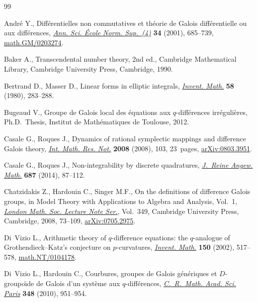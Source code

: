 \documentclass[pdftex]{sigma}
\numberwithin{equation}{section}
\begin{document}
\begin{thebibliography}{99}
\footnotesize \itemsep=0pt

Andr{\'e} Y., Dif\/f\'erentielles non commutatives et th\'eorie de {G}alois dif\/f\'erentielle ou aux dif\/f\'erences,
\href{http://dx.doi.org/10.1016/S0012-9593(01)01074-6}{\textit{Ann. Sci. \'Ecole Norm. Sup.~(4)}} \textbf{34} (2001), 685--739, \href{http://arxiv.org/abs/math.GM/0203274}{math.GM/0203274}.

Baker A., Transcendental number theory, 2nd ed., Cambridge Mathematical Library, Cambridge University Press, Cambridge,
1990.

Bertrand D., Masser D., Linear forms in elliptic integrals, \href{http://dx.doi.org/10.1007/BF01390255}{\textit{Invent. Math.}} \textbf{58} (1980), 283--288.

Bugeaud V., Groupe de {G}alois local des \'equations aux {$q$}-dif\/f\'erences irr\'eguli\`eres, Ph.D.~Thesis, Institut de
Math\'ematiques de Toulouse, 2012.

Casale G., Roques J., Dynamics of rational symplectic mappings and dif\/ference {G}alois theory,
\href{http://dx.doi.org/10.1093/imrn/rnn103}{\textit{Int. Math. Res. Not.}} \textbf{2008} (2008), 103, 23~pages, \href{http://arxiv.org/abs/0803.3951}{arXiv:0803.3951}.

Casale G., Roques J., Non-integrability by discrete quadratures,
\href{http://dx.doi.org/10.1515/crelle-2012-0054}{\textit{J.~Reine Angew. Math.}} \textbf{687} (2014), 87--112.

Chatzidakis Z., Hardouin C., Singer M.F., On the def\/initions of dif\/ference {G}alois groups, in Model Theory with
Applications to Algebra and Analysis, {V}ol.~1, \href{http://dx.doi.org/10.1017/CBO9780511735226.006}{\textit{London Math. Soc. Lecture Note Ser.}}, Vol.~349, Cambridge University Press, Cambridge, 2008, 73--109,
\href{http://arxiv.org/abs/0705.2975}{arXiv:0705.2975}.

Di~Vizio L., Arithmetic theory of {$q$}-dif\/ference equations: the {$q$}-analogue of {G}rothendieck--{K}atz's conjecture
on {$p$}-curvatures, \href{http://dx.doi.org/10.1007/s00222-002-0241-z}{\textit{Invent. Math.}} \textbf{150} (2002), 517--578, \href{http://arxiv.org/abs/math.NT/0104178}{math.NT/0104178}.

Di~Vizio L., Hardouin C., Courbures, groupes de {G}alois g\'en\'eriques et {$D$}-groupo\"\i de de {G}alois d'un
syst\`eme aux {$q$}-dif\/f\'erences, \href{http://dx.doi.org/10.1016/j.crma.2010.08.001}{\textit{C.~R.~Math. Acad. Sci. Paris}} \textbf{348} (2010), 951--954.


\end{thebibliography}
\end{document}
